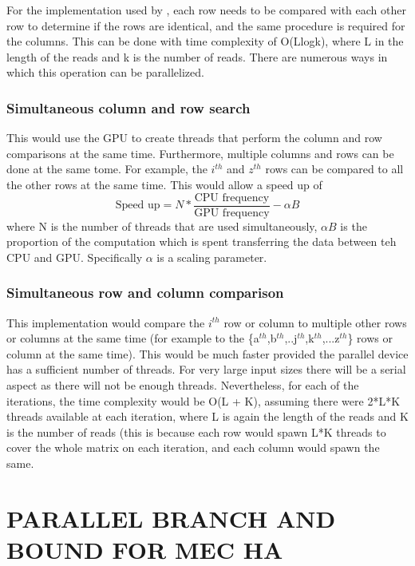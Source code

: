 \documentclass[10pt,twocolumn]{witseiepaper}
\begin{document}
For the implementation used by \cite{chen:2013}, each row needs to be compared with each other row to
determine if the rows are identical, and the same procedure is required for the columns. This can be done with
time complexity of O(Llogk), where L in the length of the reads and k is the number of reads. There are
numerous ways in which this operation can be parallelized.

\subsubsection{Simultaneous column and row search} This would use the GPU to create threads that perform the
column and row comparisons at the same time. Furthermore, multiple columns and rows can be done at the same
tome. For example, the $i^{th}$ and $z^{th}$ rows can be compared to all the other rows at the same time. This
would allow a speed up of  
\begin{equation}
    \textrm{Speed up} = N * \frac{\textrm{CPU frequency}}{\textrm{GPU frequency}} - \alpha B
\end{equation}
where N is the number of threads that are used simultaneously, $\alpha B$ is the proportion of the computation
which is spent transferring the data between teh CPU and GPU. Specifically $\alpha$ is a scaling parameter.

\subsubsection{Simultaneous row and column comparison} This implementation would compare the $i^{th}$ row or
column to multiple other rows or columns at the same time (for example to the
\{a$^{th}$,b$^{th}$,..j$^{th}$,k$^{th}$,...z$^{th}$\} rows or column at the same time). This would be much
faster provided the parallel device has a sufficient number of threads. For very large input sizes there will
be a serial aspect as there will not be enough threads. Nevertheless, for each of the iterations, the time
complexity would be O(L + K), assuming there were 2*L*K threads available at each iteration, where L is again
the length of the reads and K is the number of reads (this is because each row would spawn L*K threads to
cover the whole matrix on each iteration, and each column would spawn the same.

\section{PARALLEL BRANCH AND BOUND FOR MEC HA }
\end{document}
